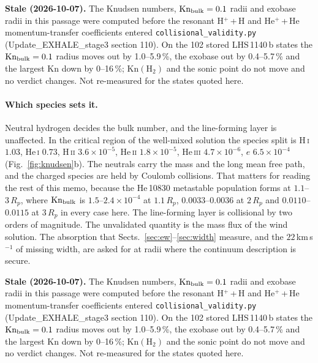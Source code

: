 \documentclass[english,a4paper]{my_memo}
\begin{document}
\noindent\textbf{Stale (2026-10-07).} The Knudsen numbers, $\mathrm{Kn}_{\rm bulk}=0.1$ radii and exobase radii in this passage were computed before the resonant H$^+$\,+\,H and He$^+$\,+\,He momentum-transfer coefficients entered \texttt{collisional\_validity.py} (Update\_EXHALE\_stage3 section 110). On the 102 stored LHS\,1140\,b states the $\mathrm{Kn}_{\rm bulk}=0.1$ radius moves out by 1.0--5.9\,\%, the exobase out by 0.4--5.7\,\% and the largest Kn down by 0--16\,\%; $\mathrm{Kn}(\mathrm{H_2})$ and the sonic point do not move and no verdict changes. Not re-measured for the states quoted here.

\paragraph{Which species sets it.} Neutral hydrogen decides the bulk number,
and the line-forming layer is unaffected. In the critical region of the
well-mixed solution the species split is H\,\textsc{i} $1.03$,
He\,\textsc{i} $0.73$, H\,\textsc{ii} $3.6\times10^{-5}$, He\,\textsc{ii}
$1.8\times10^{-5}$, He\,\textsc{iii} $4.7\times10^{-6}$, $e$
$6.5\times10^{-4}$ (Fig.~\ref{fig:knudsen}b). The neutrals carry the mass and
the long mean free path, and the charged species are held by Coulomb
collisions. That matters for reading the rest of this memo, because the
He\,10830 metastable population forms at $1.1$--$3\,R_p$, where
$\mathrm{Kn}_{\rm bulk}$ is $1.5$--$2.4\times10^{-4}$ at $1.1\,R_p$,
$0.0033$--$0.0036$ at $2\,R_p$ and $0.0110$--$0.0115$ at $3\,R_p$ in every
case here. The line-forming layer is collisional by two orders of magnitude.
The unvalidated quantity is the mass flux of the wind solution. The
absorption that Sects.~\ref{sec:ew}--\ref{sec:width} measure, and the
$22$\,km\,s$^{-1}$ of missing width, are asked for at radii where the
continuum description is secure.

\noindent\textbf{Stale (2026-10-07).} The Knudsen numbers, $\mathrm{Kn}_{\rm bulk}=0.1$ radii and exobase radii in this passage were computed before the resonant H$^+$\,+\,H and He$^+$\,+\,He momentum-transfer coefficients entered \texttt{collisional\_validity.py} (Update\_EXHALE\_stage3 section 110). On the 102 stored LHS\,1140\,b states the $\mathrm{Kn}_{\rm bulk}=0.1$ radius moves out by 1.0--5.9\,\%, the exobase out by 0.4--5.7\,\% and the largest Kn down by 0--16\,\%; $\mathrm{Kn}(\mathrm{H_2})$ and the sonic point do not move and no verdict changes. Not re-measured for the states quoted here.
\end{document}
